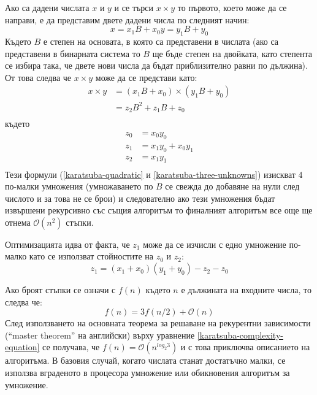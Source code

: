   Ако са дадени числата $x$ и $y$ и се търси $x \times y$ то първото, което може да се направи, е да представим двете дадени числа по следният начин:
  \begin{equation}
    x = x_1 B + x_0
    y = y_1 B + y_0
    \label{karatsuba-breakability}
  \end{equation}
  Където $B$ е степен на основата, в която са представени в числата (ако са представени в бинарната система то $B$ ще бъде степен на двойката, като степента се избира така, че двете нови числа да бъдат приблизително равни по дължина). От това следва че $x \times y$ може да се представи като:
  \begin{equation}
    \begin{split}
      x \times y &= (x_1 B + x_0) \times (y_1 B + y_0) \\
                 &= z_2 B^2 + z_1 B + z_0 \\
    \end{split}
    \label{karatsuba-quadratic}
  \end{equation}
  където
  \begin{equation}
    \begin{split}
      z_0 &= x_0 y_0 \\
      z_1 &= x_1 y_0 + x_0 y_1 \\
      z_2 &= x_1 y_1 \\
    \end{split}
    \label{karatsuba-three-unknowns}
  \end{equation}
  Тези формули (\ref{karatsuba-quadratic} и \ref{karatsuba-three-unknowns}) изискват 4 по-малки умножения (умножаването по $B$ се свежда до добавяне на нули след числото и за това не се брои) и следователно ако тези умножения бъдат извършени рекурсивно със същия алгоритъм то финалният алгоритъм все още ще отнема $\mathcal{O}(n^2)$ стъпки.

  Оптимизацията идва от факта, че $z_1$ може да се изчисли с едно умножение по-малко като се използват стойностите на $z_0$ и $z_2$:
  \begin{equation}
    z_1 = (x_1 + x_0)(y_1 + y_0) - z_2 - z_0
    \label{karatsuba-trick}
  \end{equation}

  Ако броят стъпки се означи с $f(n)$ където $n$ е дължината на входните числа, то следва че:
  \begin{equation}
    f(n) = 3f(n/2) + \mathcal{O}(n)
    \label{karatsuba-complexity-equation}
  \end{equation}
  След използването на основната теорема за решаване на рекурентни зависимости\cite[глава~4.5]{algo-intro} (``master theorem'' на английски) върху уравнение \ref{karatsuba-complexity-equation} се получава, че $f(n) = \mathcal{O}(n^{log_2 3})$ и с това приключва описанието на алгоритъма. В базовия случай, когато числата станат достатъчно малки, се използва вграденото в процесора умножение или обикновения алгоритъм за умножение.


